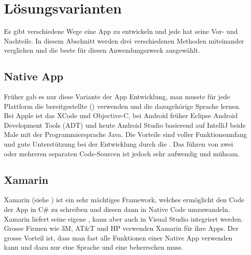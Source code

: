 \newpage
\section{Lösungsvarianten}\label{loesungsvarianten}
Es gibt verschiedene Wege eine App zu entwickeln und jede hat seine Vor- und Nachteile. In diesem Abschnitt werden drei verschiedenen Methoden miteinander verglichen und die beste für diesen Anwendungszweck ausgewählt.

\subsection{Native App}\label{architektur_native}
Früher gab es nur diese Variante der App Entwicklung, man musste für jede Plattform die bereitgestellte  () verwenden und die dazugehörige Sprache lernen. Bei Apple ist das XCode und Objective-C, bei Android früher Eclipse Android Development Tools (ADT) und heute Android Studio basierend auf IntelliJ beide Male mit der Programmiersprache Java. Die Vorteile sind voller Funktionsumfang und gute Unterstützung bei der Entwicklung durch die . Das führen von zwei oder mehreren separaten Code-Sourcen ist jedoch sehr aufwendig und mühsam.

\subsection{Xamarin}\label{architektur_xamarin}
Xamarin (siehe \cite{xamarin}) ist ein sehr mächtiges Framework, welches ermöglicht den Code der App in C\# zu schreiben und diesen dann in Native Code umzuwandeln. Xamarin liefert seine eigene , kann aber auch in Visual Studio integriert werden. Grosse Firmen wie 3M, AT\&T und HP verwenden Xamarin für ihre Apps. Der grosse Vorteil ist, dass man fast alle Funktionen einer Native App verwenden kann und dazu nur eine Sprache und eine  beherrschen muss. 

